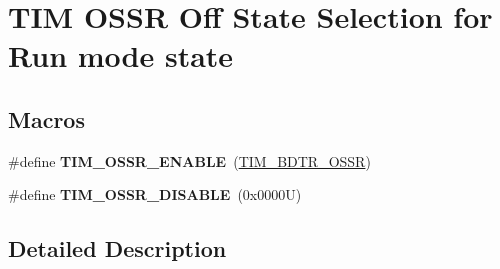 \hypertarget{group___t_i_m___o_s_s_r___off___state___selection__for___run__mode__state}{}\section{T\+IM O\+S\+SR Off State Selection for Run mode state}
\label{group___t_i_m___o_s_s_r___off___state___selection__for___run__mode__state}
\subsection*{Macros}
\begin{DoxyCompactItemize}
\item 
\mbox{\label{group___t_i_m___o_s_s_r___off___state___selection__for___run__mode__state_ga5d21918f173eca946748a1fbc177daa5}} 
\#define {\bfseries T\+I\+M\+\_\+\+O\+S\+S\+R\+\_\+\+E\+N\+A\+B\+LE}~(\hyperlink{group___peripheral___registers___bits___definition_gaf9435f36d53c6be1107e57ab6a82c16e}{T\+I\+M\+\_\+\+B\+D\+T\+R\+\_\+\+O\+S\+SR})
\item 
\mbox{\label{group___t_i_m___o_s_s_r___off___state___selection__for___run__mode__state_gae11820b467ef6d74c90190c8cfce5e73}} 
\#define {\bfseries T\+I\+M\+\_\+\+O\+S\+S\+R\+\_\+\+D\+I\+S\+A\+B\+LE}~(0x0000\+U)
\end{DoxyCompactItemize}


\subsection{Detailed Description}
